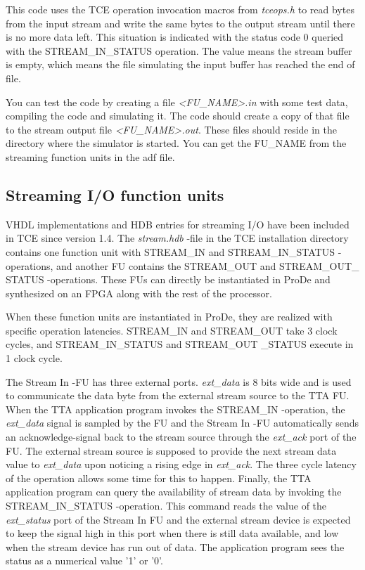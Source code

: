 \documentclass[twoside]{tceusermanual}
\begin{document}
This code uses the TCE operation invocation macros from \textit{tceops.h}
to read bytes from the input stream and write the same bytes to the
output stream until there is no more data left. This situation is indicated
with the status code 0 queried with the STREAM\_IN\_STATUS operation. The
value means the stream buffer is empty, which means the file simulating the
input buffer has reached the end of file.

You can test the code by creating a file \textit{<FU\_NAME>.in} with some test
data, compiling the code and simulating it. The code should create a copy of
that file to the stream output file \textit{<FU\_NAME>.out}. These files
should reside in the directory where the simulator is started. You can get
the FU\_NAME from the streaming function units in the adf file.

\subsection{Streaming I/O function units}
VHDL implementations and HDB entries for streaming I/O have been included 
in TCE since version 1.4. The \textit{stream.hdb} -file in the TCE installation
directory contains one function unit with STREAM\_IN and
STREAM\_IN\_STATUS -operations, and another FU contains the STREAM\_OUT and STREAM\_OUT\_
STATUS
-operations. These FUs can directly be instantiated in ProDe and synthesized
on an FPGA along with the rest of the processor.

When these function units are instantiated in ProDe, they are realized with
specific operation latencies. STREAM\_IN and STREAM\_OUT
take 3 clock cycles, and STREAM\_IN\_STATUS and STREAM\_OUT
\_STATUS execute in 1 clock cycle.

The Stream In -FU has three external ports. \textit{ext\_data} is 8 bits wide
and is used to communicate the data byte from the external stream source to the 
TTA FU. When the TTA application program invokes the STREAM\_IN -operation, the
\textit{ext\_data} signal is sampled by the FU and the Stream In -FU automatically sends
an acknowledge-signal back to the stream source through the \textit{ext\_ack}
port of the FU. The external stream source is supposed to provide the next stream
data value to \textit{ext\_data} upon noticing a rising edge in \textit{ext\_ack}.
The three cycle latency of the operation allows some time for this to happen. Finally,
the TTA application program can query the availability of stream data by invoking
the STREAM\_IN\_STATUS -operation. This command reads the value of the \textit{ext\_status}
port of the Stream In FU and the external stream device is expected to keep the signal
high in this port when there is still data available, and low when the stream 
device has run out of data. The application program sees the status as a numerical 
value '1' or '0'.
\end{document}

